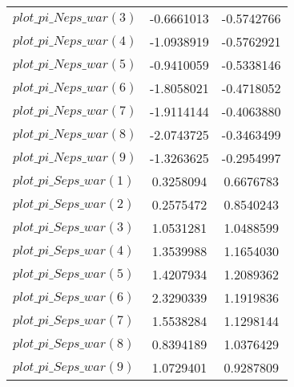 \begin{center}
\begin{longtable}{lcc}
$plot\_pi\_N eps\_war (3)   $	 & 	     -0.6661013	 & 	     -0.5742766 \\ 
$plot\_pi\_N eps\_war (4)   $	 & 	     -1.0938919	 & 	     -0.5762921 \\ 
$plot\_pi\_N eps\_war (5)   $	 & 	     -0.9410059	 & 	     -0.5338146 \\ 
$plot\_pi\_N eps\_war (6)   $	 & 	     -1.8058021	 & 	     -0.4718052 \\ 
$plot\_pi\_N eps\_war (7)   $	 & 	     -1.9114144	 & 	     -0.4063880 \\ 
$plot\_pi\_N eps\_war (8)   $	 & 	     -2.0743725	 & 	     -0.3463499 \\ 
$plot\_pi\_N eps\_war (9)   $	 & 	     -1.3263625	 & 	     -0.2954997 \\ 
$plot\_pi\_S eps\_war (1)   $	 & 	      0.3258094	 & 	      0.6676783 \\ 
$plot\_pi\_S eps\_war (2)   $	 & 	      0.2575472	 & 	      0.8540243 \\ 
$plot\_pi\_S eps\_war (3)   $	 & 	      1.0531281	 & 	      1.0488599 \\ 
$plot\_pi\_S eps\_war (4)   $	 & 	      1.3539988	 & 	      1.1654030 \\ 
$plot\_pi\_S eps\_war (5)   $	 & 	      1.4207934	 & 	      1.2089362 \\ 
$plot\_pi\_S eps\_war (6)   $	 & 	      2.3290339	 & 	      1.1919836 \\ 
$plot\_pi\_S eps\_war (7)   $	 & 	      1.5538284	 & 	      1.1298144 \\ 
$plot\_pi\_S eps\_war (8)   $	 & 	      0.8394189	 & 	      1.0376429 \\ 
$plot\_pi\_S eps\_war (9)   $	 & 	      1.0729401	 & 	      0.9287809 \\ 
\end{longtable}
 \end{center}
